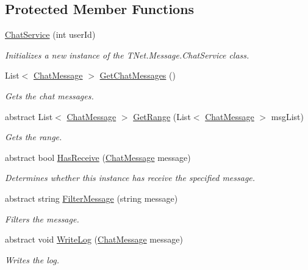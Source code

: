 \subsection*{Protected Member Functions}
\begin{DoxyCompactItemize}
\item 
\mbox{\hyperlink{class_chat_service_a12dc266664c0a263013841e75dc949fa}{Chat\+Service}} (int user\+Id)
\begin{DoxyCompactList}\small\item\em Initializes a new instance of the T\+Net.\+Message.\+Chat\+Service class. \end{DoxyCompactList}\item 
List$<$ \mbox{\hyperlink{class_t_net_1_1_model_1_1_chat_message}{Chat\+Message}} $>$ \mbox{\hyperlink{class_chat_service_aae1d333e18b5b7b6528fadde15a9181d}{Get\+Chat\+Messages}} ()
\begin{DoxyCompactList}\small\item\em Gets the chat messages. \end{DoxyCompactList}\item 
abstract List$<$ \mbox{\hyperlink{class_t_net_1_1_model_1_1_chat_message}{Chat\+Message}} $>$ \mbox{\hyperlink{class_chat_service_a0386ca23c48f3d389bbb600565585d37}{Get\+Range}} (List$<$ \mbox{\hyperlink{class_t_net_1_1_model_1_1_chat_message}{Chat\+Message}} $>$ msg\+List)
\begin{DoxyCompactList}\small\item\em Gets the range. \end{DoxyCompactList}\item 
abstract bool \mbox{\hyperlink{class_chat_service_ac3b151ae5fe90fe7b8e78a8ea1a11a27}{Has\+Receive}} (\mbox{\hyperlink{class_t_net_1_1_model_1_1_chat_message}{Chat\+Message}} message)
\begin{DoxyCompactList}\small\item\em Determines whether this instance has receive the specified message. \end{DoxyCompactList}\item 
abstract string \mbox{\hyperlink{class_chat_service_a110f921d7a54356b2cb357d241af37fb}{Filter\+Message}} (string message)
\begin{DoxyCompactList}\small\item\em Filters the message. \end{DoxyCompactList}\item 
abstract void \mbox{\hyperlink{class_chat_service_a906fad4202a26ffa55febf4a5fd6dd7e}{Write\+Log}} (\mbox{\hyperlink{class_t_net_1_1_model_1_1_chat_message}{Chat\+Message}} message)
\begin{DoxyCompactList}\small\item\em Writes the log. \end{DoxyCompactList}\end{DoxyCompactItemize}
